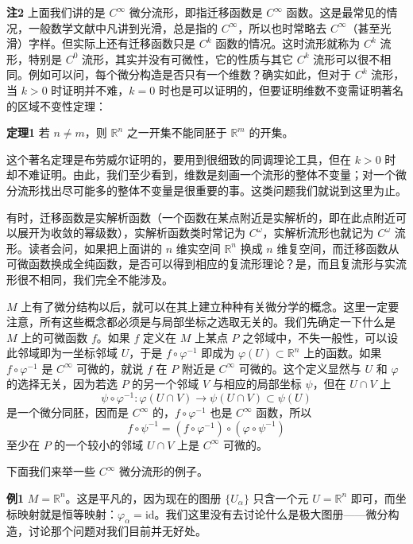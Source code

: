 \noindent\textbf{注2}\quad
上面我们讲的是 $C^\infty$ 微分流形，即指迁移函数是 $C^\infty$ 函数。这是最常见的情况，一般数学文献中凡讲到光滑，总是指的 $C^\infty$，所以也时常略去 $C^\infty$（甚至光滑）字样。但实际上还有迁移函数只是 $C^k$ 函数的情况。这时流形就称为 $C^k$ 流形，特别是 $C^0$ 流形，其实并没有可微性，它的性质与其它 $C^k$ 流形可以很不相同。例如可以问，每个微分构造是否只有一个维数？确实如此，但对于 $C^k$ 流形，当 $k>0$ 时证明并不难，$k=0$ 时也是可以证明的，但要证明维数不变需证明著名的区域不变性定理：

\noindent\textbf{定理1}\quad
若 $n\ne m$，则 $\mathbb R^n$ 之一开集不能同胚于 $\mathbb R^m$ 的开集。

这个著名定理是布劳威尔证明的，要用到很细致的同调理论工具，但在 $k>0$ 时却不难证明。由此，我们至少看到，维数是刻画一个流形的整体不变量；对一个微分流形找出尽可能多的整体不变量是很重要的事。这类问题我们就说到这里为止。

有时，迁移函数是实解析函数（一个函数在某点附近是实解析的，即在此点附近可以展开为收敛的幂级数），实解析函数类时常记为 $C^\omega$，实解析流形也就记为 $C^\omega$ 流形。读者会问，如果把上面讲的 $n$ 维实空间 $\mathbb R^n$ 换成 $n$ 维复空间，而迁移函数从可微函数换成全纯函数，是否可以得到相应的复流形理论？是，而且复流形与实流形很不相同，我们完全不能涉及。

$M$ 上有了微分结构以后，就可以在其上建立种种有关微分学的概念。这里一定要注意，所有这些概念都必须是与局部坐标之选取无关的。我们先确定一下什么是 $M$ 上的可微函数 $f$。如果 $f$ 定义在 $M$ 上某点 $P$ 之邻域中，不失一般性，可以设此邻域即为一坐标邻域 $U$，于是 $f\circ\varphi^{-1}$ 即成为 $\varphi(U)\subset\mathbb R^n$ 上的函数。如果 $f\circ\varphi^{-1}$ 是 $C^\infty$ 可微的，就说 $f$ 在 $P$ 附近是 $C^\infty$ 可微的。这个定义显然与 $U$ 和 $\varphi$ 的选择无关，因为若选 $P$ 的另一个邻域 $V$ 与相应的局部坐标 $\psi$，但在 $U\cap V$ 上
\[
 \psi\circ\varphi^{-1}:\varphi(U\cap V)\longrightarrow\psi(U\cap V)\subset\psi(U)
\]
是一个微分同胚，因而是 $C^\infty$ 的，$f\circ\varphi^{-1}$ 也是 $C^\infty$ 函数，所以
\[
 f\circ\psi^{-1}=(f\circ\varphi^{-1})\circ(\varphi\circ\psi^{-1})
\]
至少在 $P$ 的一个较小的邻域 $U\cap V$ 上是 $C^\infty$ 可微的。

下面我们来举一些 $C^\infty$ 微分流形的例子。

\noindent\textbf{例1}\quad
$M=\mathbb R^n$。这是平凡的，因为现在的图册 $\{U_\alpha\}$ 只含一个元 $U=\mathbb R^n$ 即可，而坐标映射就是恒等映射：$\varphi_\alpha=\mathrm{id}$。我们这里没有去讨论什么是极大图册——微分构造，讨论那个问题对我们目前并无好处。

